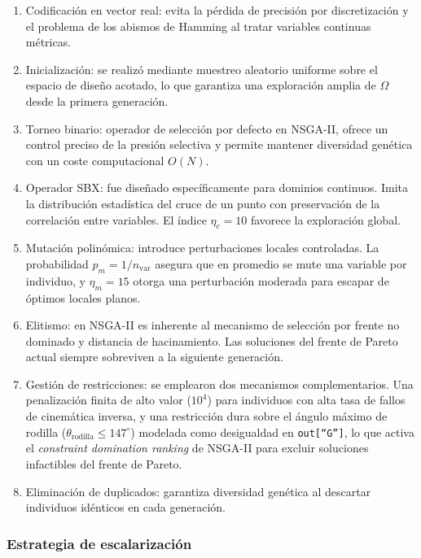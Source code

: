 \begin{enumerate}
  \item Codificación en vector real: evita la pérdida de precisión por
        discretización y el problema de los abismos de Hamming
        \citep{goldberg1989} al tratar variables continuas métricas.
  \item Inicialización: se realizó mediante muestreo aleatorio uniforme
        sobre el espacio de diseño acotado, lo que garantiza una exploración
        amplia de $\Omega$ desde la primera generación.
  \item Torneo binario: operador de selección por defecto en NSGA-II,
        ofrece un control preciso de la presión selectiva y permite mantener
        diversidad genética con un coste computacional $O(N)$.
  \item Operador SBX: fue diseñado específicamente para dominios
        continuos. Imita la distribución estadística del cruce de un punto con
        preservación de la correlación entre variables. El índice $\eta_c=10$
        favorece la exploración global.
  \item Mutación polinómica: introduce perturbaciones locales
        controladas. La probabilidad $p_m=1/n_{\text{var}}$ asegura que en
        promedio se mute una variable por individuo, y $\eta_m=15$ otorga una
        perturbación moderada para escapar de óptimos locales planos.
  \item Elitismo: en NSGA-II es inherente al mecanismo de selección
        por frente no dominado y distancia de hacinamiento. Las soluciones del
        frente de Pareto actual siempre sobreviven a la siguiente generación.
  \item Gestión de restricciones: se emplearon dos mecanismos
        complementarios. Una penalización finita de alto valor ($10^4$) para
        individuos con alta tasa de fallos de cinemática inversa, y una
        restricción dura sobre el ángulo máximo de rodilla
        ($\theta_{\text{rodilla}} \leq 147^\circ$) modelada como desigualdad en
        \texttt{out[``G'']}, lo que activa el \textit{constraint domination
          ranking} de NSGA-II para excluir soluciones infactibles del frente de
        Pareto.
  \item Eliminación de duplicados: garantiza diversidad genética al
        descartar individuos idénticos en cada generación.
\end{enumerate}

\subsubsection{Estrategia de escalarización}

